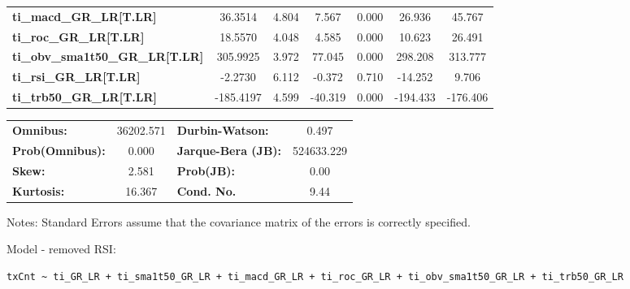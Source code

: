 \begin{center}
\begin{tabular}{lcccccc}
\textbf{ti\_macd\_GR\_LR[T.LR]}         &      36.3514  &        4.804     &     7.567  &         0.000        &       26.936    &       45.767     \\
\textbf{ti\_roc\_GR\_LR[T.LR]}          &      18.5570  &        4.048     &     4.585  &         0.000        &       10.623    &       26.491     \\
\textbf{ti\_obv\_sma1t50\_GR\_LR[T.LR]} &     305.9925  &        3.972     &    77.045  &         0.000        &      298.208    &      313.777     \\
\textbf{ti\_rsi\_GR\_LR[T.LR]}          &      -2.2730  &        6.112     &    -0.372  &         0.710        &      -14.252    &        9.706     \\
\textbf{ti\_trb50\_GR\_LR[T.LR]}        &    -185.4197  &        4.599     &   -40.319  &         0.000        &     -194.433    &     -176.406     \\
\bottomrule
\end{tabular}
\begin{tabular}{lclc}
\textbf{Omnibus:}       & 36202.571 & \textbf{  Durbin-Watson:     } &     0.497   \\
\textbf{Prob(Omnibus):} &    0.000  & \textbf{  Jarque-Bera (JB):  } & 524633.229  \\
\textbf{Skew:}          &    2.581  & \textbf{  Prob(JB):          } &      0.00   \\
\textbf{Kurtosis:}      &   16.367  & \textbf{  Cond. No.          } &      9.44   \\
\bottomrule
\end{tabular}
\end{center}

Notes: \newline
 [1] Standard Errors assume that the covariance matrix of the errors is correctly specified.

Model - removed RSI: \begin{verbatim}txCnt ~ ti_GR_LR + ti_sma1t50_GR_LR + ti_macd_GR_LR + ti_roc_GR_LR + ti_obv_sma1t50_GR_LR + ti_trb50_GR_LR\end{verbatim}

